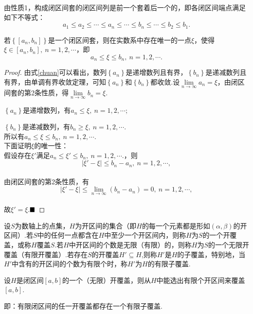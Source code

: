 由性质1，构成闭区间套的闭区间列是前一个套着后一个的，即各闭区间端点满足如下不等式：
\begin{equation}\label{chuan}
	a_1\leqslant a_2\leqslant \cdots\leqslant a_n\leqslant\cdots\leqslant b_n\leqslant\cdots\leqslant b_2\leqslant b_1.
\end{equation}
\begin{theorem}[闭区间套定理]
	若$\left\{\left[a_n,b_n\right]\right\}$是一个闭区间套，则在实数系中存在唯一的一点$\xi$，使得$\xi\in\left[a_n,b_n\right],\ n=1,2,\cdots$，即$$a_n\leqslant\xi\leqslant b_n,\ n=1,2,\cdots.$$
\end{theorem}
\begin{proof}
	由式\ref{chuan}可以看出，数列$\left\{a_n\right\}$是递增数列且有界，$\left\{b_n\right\}$是递减数列且有界，由单调有界收敛定理，可知$\left\{a_n\right\}$和$\left\{b_n\right\}$都收敛.设$\lim\limits_{n\to \infty}a_n=\xi$，由闭区间套的第2条性质，得$\lim\limits_{n\to \infty}b_n=\xi.$
	
	$\left\{a_n\right\}$是递增数列，有$a_n\leqslant\xi,\ n=1,2,\cdots;$
	
	$\left\{b_n\right\}$是递减数列，有$b_n\geqslant\xi,\ n=1,2,\cdots.$\\
	所以有$a_n\leqslant\xi\leqslant b_n,\ n=1,2,\cdots.$\\
	下面证明$\xi$的唯一性：\\
	假设存在$\xi'$满足$a_n\leqslant\xi'\leqslant b_n,\ n=1,2,\cdots.$，则\\
	$$\lvert\xi'-\xi\rvert\leqslant b_n-a_n,\ n=1,2,\cdots,$$\\
	由闭区间套的第2条性质，有
	$$\lvert\xi'-\xi\rvert\leqslant \lim\limits_{n\to\infty}(b_n-a_n)=0,\ n=1,2,\cdots,$$\\
	故$\xi'=\xi$.$\hfill\blacksquare$
\end{proof}
\begin{definition}
	设$S$为数轴上的点集，$H$为开区间的集合（即$H$的每一个元素都是形如$(\alpha,\beta)$的开区间）.若$S$中的任何一点都含在$H$中至少一个开区间内，则称$H$为$S$的一个{\heiti 开覆盖}，或称$H$覆盖$S$.若$H$中开区间的个数是无限（有限）的，则称$H$为$S$的一个{\heiti 无限开覆盖（有限开覆盖）}.若存在$S$的开覆盖$H'\subseteq H$,则称$H'$是$H$的{\heiti 子覆盖}，特别地，当$H'$中含有的开区间的个数为有限个时，称$H'$为$H$的{\heiti 有限子覆盖}.
\end{definition}
\begin{theorem}
	设$H$是闭区间$\left[a,b\right]$的一个（无限）开覆盖，则从$H$中能选出有限个开区间来覆盖$\left[a,b\right]$.
	
	即：有限闭区间的任一开覆盖都存在一个有限子覆盖.
\end{theorem}
